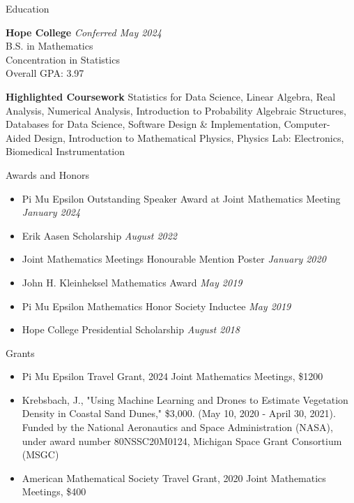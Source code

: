 \documentclass[
	11pt, %
]{resume} %
\begin{document}

\begin{rSection}{Education}
	
	\textbf{Hope College} \hfill \textit{Conferred May 2024} \\ 
	B.S. in Mathematics \\
	Concentration in Statistics \smallskip \\
	Overall GPA: 3.97

  \textbf{Highlighted Coursework}
  Statistics for Data Science, Linear Algebra, Real Analysis, Numerical Analysis, Introduction to Probability Algebraic Structures, Databases for Data Science, Software Design \& Implementation, Computer- Aided Design, Introduction to Mathematical Physics, Physics Lab: Electronics, Biomedical Instrumentation
	
\end{rSection}


\begin{rSection}{Awards and Honors}
  \begin{itemize}
    \item Pi Mu Epsilon Outstanding Speaker Award at Joint Mathematics Meeting \hfill \textit{January 2024}
    \item Erik Aasen Scholarship \hfill \textit{August 2022}

    \item Joint Mathematics Meetings Honourable Mention Poster \hfill \textit{January 2020}
    \item John H. Kleinheksel Mathematics Award \hfill \textit{May 2019} 
\item Pi Mu Epsilon Mathematics Honor Society Inductee \hfill \textit{May 2019} 
\item Hope College Presidential Scholarship \hfill \textit{August 2018} 

  \end{itemize}
    
\end{rSection}


\begin{rSection}{Grants}

  \begin{itemize}
    \item Pi Mu Epsilon Travel Grant, 2024 Joint Mathematics Meetings, \$1200

  \item Krebsbach, J., "Using Machine Learning and Drones to Estimate Vegetation Density in Coastal Sand Dunes," \$3,000. (May 10, 2020 - April 30, 2021). Funded by the National Aeronautics and Space Administration (NASA), under award number 80NSSC20M0124, Michigan Space Grant Consortium (MSGC)

  \item American Mathematical Society Travel Grant, 2020 Joint Mathematics Meetings, \$400
  \end{itemize}
\end{rSection}
\end{document}
